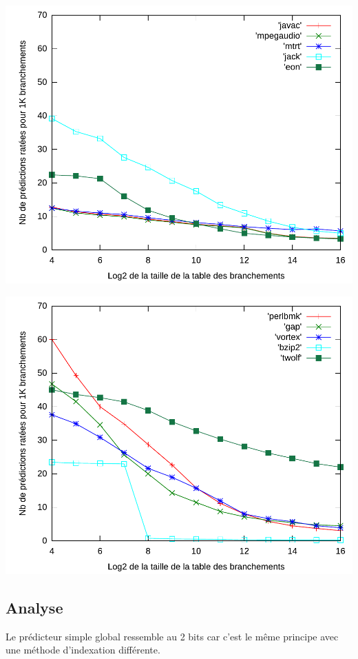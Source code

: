 \documentclass[a4paper]{article}
\begin{document}
\begin{minipage}{.48\linewidth}
\includegraphics[width=\linewidth]{../figures-simple-global/simple-global-2}
\end{minipage}%
\hfill
\begin{minipage}{.48\linewidth}
\includegraphics[width=\linewidth]{../figures-simple-global/simple-global-3}
\end{minipage}
\subsection{Analyse}
Le prédicteur simple global ressemble au 2 bits car c'est le même principe avec une méthode d'indexation différente.
\end{document}
